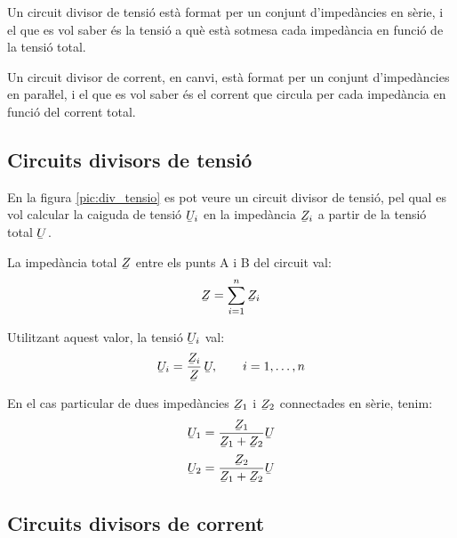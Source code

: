 Un circuit divisor de tensió està format per un conjunt
d'impedàncies en sèrie, i el que es vol saber  és  la
tensió a què està sotmesa cada impedància en funció de la tensió total.

Un circuit divisor de corrent, en canvi, està format per un conjunt
d'impedàncies en paraŀlel, i el que es vol saber és el
corrent que circula per cada impedància en funció del corrent
total.

\subsection{Circuits divisors de tensió}\label{sec:circ-div-tens}

En la figura \vref{pic:div_tensio} es pot veure un circuit divisor
de tensió, pel qual es vol calcular la caiguda de tensió
$\cmplx{U}_i$ en la impedància $\cmplx{Z}_i$ a partir de la tensió total $\cmplx{U}$.

\begin{center}
	\centering
    
    \label{pic:div_tensio}
\end{center}

La impedància total $\cmplx{Z}$ entre els punts A i B del circuit val:
\begin{equation}\label{eq:z_serie}
    \cmplx{Z} = \sum_{i=1}^n \cmplx{Z}_i
\end{equation}

Utilitzant aquest valor, la tensió $\cmplx{U}_i$ val:
\begin{equation}
    \cmplx{U}_i = \frac{\cmplx{Z}_i}{\cmplx{Z}}\,\cmplx{U}, \qquad i=1,\dots,n\label{eq:div_tensio}
\end{equation}

En el cas particular de dues impedàncies $\cmplx{Z}_1$ i $\cmplx{Z}_2$ connectades en sèrie, tenim:
\begin{subequations}
\begin{align}
    \cmplx{U}_1 &= \frac{\cmplx{Z}_1}{\cmplx{Z}_1+\cmplx{Z}_2} \cmplx{U}  \\[0.5ex]
    \cmplx{U}_2 &= \frac{\cmplx{Z}_2}{\cmplx{Z}_1+\cmplx{Z}_2} \cmplx{U}
\end{align}
\end{subequations}

\subsection{Circuits divisors de corrent}\label{sec:circ-div-corr}

